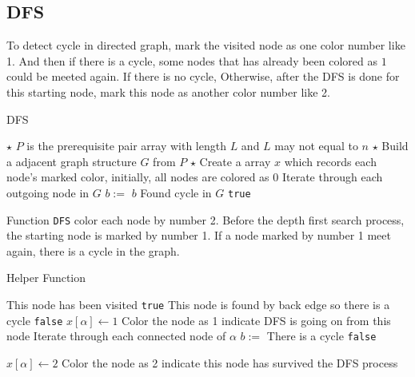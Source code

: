 \subsection{DFS}
To detect cycle in directed graph, mark the visited node as one color number like 1. And then if there is a cycle, some nodes that has already been colored as $1$ could be meeted again. If there is no cycle, Otherwise, after the DFS is done for this starting node, mark this node as another color number like 2.
\setcounter{algorithm}{0}
\begin{algorithm}[H]
\caption{DFS}
\begin{algorithmic}[1]
\State $\star$ $P$ is the prerequisite pair array with length $L$ and $L$ may not equal to $n$
\State $\star$ Build a adjacent graph structure $G$ from $P$
\State $\star$ Create a array $x$ which records each node's marked color, initially, all nodes are colored as 0
 \Comment Iterate through each outgoing node in $G$
\State $b:=$ 
\State \Return $b$ \Comment Found cycle in $G$
\EndIf
\State \Return \texttt{true}
\EndFor
\EndProcedure
\end{algorithmic}
\end{algorithm}
Function \texttt{DFS} color each node by number 2. Before the depth first search process, the starting node is marked by number 1. If a node marked by number 1 meet again, there is a cycle in the graph. 
\begin{algorithm}[H]
\caption{Helper Function}
\begin{algorithmic}[1]
 \Comment This node has been visited
\State \Return \texttt{true}
\EndIf
{} \Comment This node is found by back edge so there is a cycle
\State \Return \texttt{false}
\EndIf
\State $x[\alpha]\gets 1$ \Comment Color the node as 1 indicate DFS is going on from this node
 \Comment Iterate through each connected node of $\alpha$
\State $b:=$ 
 \Comment There is a cycle
\State \Return \texttt{false}
\EndIf
{}
\end{algorithmic}
\end{algorithm}
\begin{algorithm}[H]
\begin{algorithmic}[1]
\EndFor
\State $x[\alpha]\gets 2$ \Comment Color the node as 2 indicate this node has survived the DFS process
\EndFunction
\end{algorithmic}
\end{algorithm}
